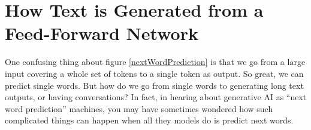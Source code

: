 \section{How Text is Generated from a Feed-Forward Network}


One confusing thing about figure \ref{nextWordPrediction} is that we go from a large input covering a whole set of tokens to a single token as output. So great, we can predict single words. But how do we go from single words to generating long text outputs, or having conversations? In fact, in hearing about generative AI as ``next word prediction'' machines, you may have sometimes wondered how such complicated things can happen when all they models do is predict next words.

